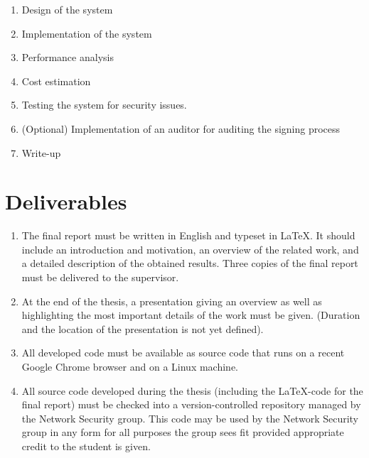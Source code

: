 \documentclass[a4paper, 11pt]{article}
\begin{document}
\begin{enumerate}
\item Design of the system
\item Implementation of the system
\item Performance analysis
\item Cost estimation
\item Testing the system for security issues.
\item (Optional) Implementation of an auditor for auditing the signing process
\item Write-up
\end{enumerate}

\section{Deliverables}
\begin{enumerate}
\item The final report must be written in English and typeset in \LaTeX. It should include an introduction and motivation, an overview of the related work, and a detailed description of the obtained results. Three copies of the final report must be delivered to the supervisor.
\item At the end of the thesis, a presentation giving an overview as well as highlighting the most important details of the work must be given. (Duration and the location of the presentation is not yet defined).
\item All developed code must be available as source code that runs on a recent Google Chrome browser and on a Linux machine.%
\item All source code developed during the thesis (including the \LaTeX-code for the final report) must be checked into a version-controlled repository managed by the Network Security group. This code may be used by the Network Security group in any form for all purposes the group sees fit provided appropriate credit to the student is given.
\end{enumerate}



\end{document}
